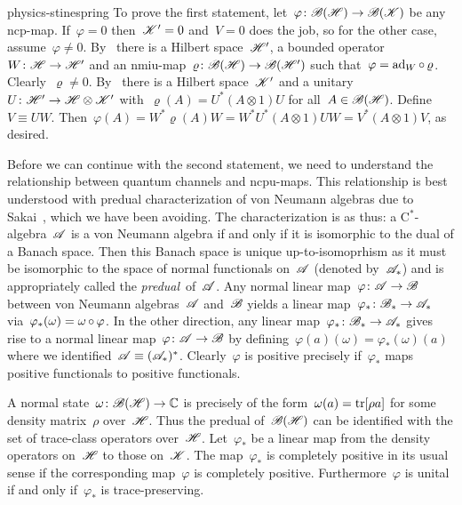 \documentclass[b5page]{book}
\begin{document}
\begin{solution}{physics-stinespring}%
To prove the first statement,
let~$\varphi \colon \mathscr{B}(\mathscr{H}) \to \mathscr{B}(\mathscr{K})$ be any ncp-map.
If~$\varphi=0$ then~$\mathscr{K}'=0$ and~$V=0$ does the job,
        so for the other case, assume~$\varphi \neq 0$.
    By~
        there is a Hilbert space~$\mathscr{H}'$,
        a bounded operator~$W \colon \mathscr{H} \to \mathscr{H}'$ and an
        nmiu-map~$\varrho \colon \mathscr{B}(\mathscr{H}) \to \mathscr{B}(\mathscr{H}')$
        such that~$\varphi = \mathrm{ad}_W \mathop{\circ} \varrho$.
Clearly~$\varrho \neq 0$.
    By~
        there is a Hilbert space~$\mathscr{K}'$
        and a unitary~$U \colon \mathscr{H}' \to \mathscr{H} \otimes \mathscr{K}'$
        with~$\varrho(A) = U^* (A \otimes 1) U$
         for all~$A \in \mathscr{B}(\mathscr{H})$.
Define~$V \equiv UW$.
    Then~$\varphi(A) = W^* \varrho(A) W = W^*U^* (A \otimes 1) UW
        =  V^* (A \otimes 1 ) V$, as desired.

Before we can continue with the second statement,
    we need to understand the relationship
    between quantum channels and ncpu-maps.
This relationship is best understood with
    predual characterization of von Neumann algebras
    due to Sakai~\cite{sakai}, which we have been avoiding.
The characterization is as thus:
    a C$^*$-algebra~$\mathscr{A}$ is a von Neumann algebra
    if and only if it is isomorphic to the dual of a Banach space.
Then this Banach space is unique up-to-isomoprhism
    as it must be isomorphic to the space of normal functionals on~$\mathscr{A}$
    (denoted by~$\mathscr{A}_*$)
    and is appropriately called the \emph{predual}~of~$\mathscr{A}$.
Any normal linear map~$\varphi\colon \mathscr{A} \to \mathscr{B}$
    between von Neumann algebras~$\mathscr{A}$ and~$\mathscr{B}$
    yields a linear map~$\varphi_*\colon \mathscr{B}_* \to \mathscr{A}_*$
    via~$\varphi_*(\omega) = \omega \mathop{\circ} \varphi$.
In the other direction, any linear map~$\varphi_* \colon \mathscr{B}_* \to \mathscr{A}_*$
    gives rise to a normal linear map~$\varphi\colon \mathscr{A} \to \mathscr{B}$
    by defining~$\varphi(a)(\omega) = \varphi_*(\omega)(a)$
    where we identified~$\mathscr{A} \equiv (\mathscr{A}_*)^*$.
Clearly~$\varphi$ is positive precisely
    if~$\varphi_*$ maps positive functionals to positive functionals.

A normal state~$\omega\colon \mathscr{B}(\mathscr{H}) \to \mathbb{C}$
    is precisely of the form~$\omega(a) = \mathop{\mathrm{tr}}[\rho a]$ for some density
        matrix~$\rho$ over~$\mathscr{H}$.
Thus the predual of~$\mathscr{B}(\mathscr{H})$ can be identified
    with the set of trace-class operators over~$\mathscr{H}$.
Let~$\varphi_*$ be a linear map from the density operators
    on~$\mathscr{H}$ to those on~$\mathscr{K}$.
The map~$\varphi_*$ is completely positive in its usual sense
    if the corresponding map~$\varphi$ is completely positive.
Furthermore~$\varphi$ is unital if and only if~$\varphi_*$
    is trace-preserving.


\end{solution}
\end{document}
